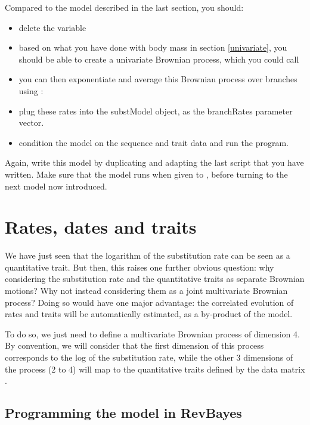 Compared to the model described in the last section, you should:
\begin{itemize}
\item
delete the  variable
\item
based on what you have done with body mass in section \ref{univariate}, you should be able to create a univariate Brownian process, which you could call 
\item
you can then exponentiate and average this Brownian process over branches using :
\\
\item
plug these rates into the substModel object, as the branchRates parameter vector.
\item
condition the model on the sequence and trait data and run the program.
\end{itemize}
Again, write this model by duplicating and adapting the last script that you have written. Make sure that the model runs when given to , before turning to the next model now introduced.

\section{Rates, dates and traits}

We have just seen that the logarithm of the substitution rate can be seen as a quantitative trait. But then, this raises one further obvious question: why considering the substitution rate and the quantitative traits as separate Brownian motions? Why not instead considering them as a joint multivariate Brownian process? Doing so would have one major advantage: the correlated evolution of rates and traits will be automatically estimated, as a by-product of the model.

To do so, we just need to define a multivariate Brownian process of dimension 4.
By convention, we will consider that the first dimension of this process
corresponds to the log of the substitution rate,
while the other 3 dimensions of the process (2 to 4) will map to the quantitative traits defined by the data matrix
\citep{Lartillot:2011p55}.

\subsection{Programming the model in RevBayes}

